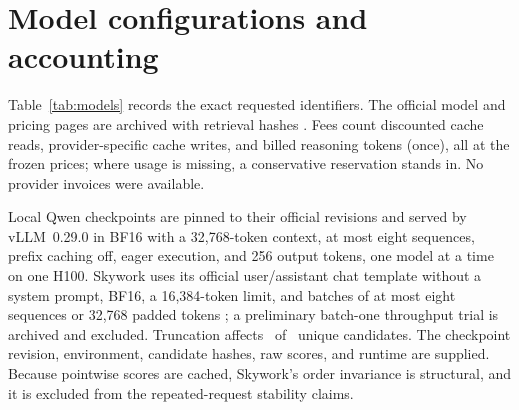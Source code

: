 \documentclass[11pt]{article}
\begin{document}
\section{Model configurations and accounting}
\label{app:models}
Table~\ref{tab:models} records the exact requested identifiers. The official model and pricing pages are archived with retrieval hashes \citep{jevmodels,gptminiapi,gptapi,gptreasonapi,gpt54api,gpt56api,gpt6api,groqoss,groqqwen36,groqqwen38,claudepricing,geminipricing}. Fees count discounted cache reads, provider-specific cache writes, and billed reasoning tokens (once), all at the frozen prices; where usage is missing, a conservative reservation stands in. No provider invoices were available.
\begin{apptable}
\centering\small\setlength{\tabcolsep}{3pt}
\caption{Exact requested identifiers/settings. Prices are USD per million input/output tokens before cache adjustments. JEV charges for input tokens and has zero output-token fees. Local models have no assigned API-equivalent dollar price.}
\label{tab:models}
\end{apptable}
Local Qwen checkpoints are pinned to their official revisions \citep{qwen3card,qwen35card} and served by vLLM~0.29.0 in BF16 with a 32,768-token context, at most eight sequences, prefix caching off, eager execution, and 256 output tokens, one model at a time on one H100. Skywork uses its official user/assistant chat template without a system prompt, BF16, a 16,384-token limit, and batches of at most eight sequences or 32,768 padded tokens \citep{skywork}; a preliminary batch-one throughput trial is archived and excluded. Truncation affects \revSkyTruncated\ of \revSkyCandidates\ unique candidates. The checkpoint revision, environment, candidate hashes, raw scores, and runtime are supplied. Because pointwise scores are cached, Skywork's order invariance is structural, and it is excluded from the repeated-request stability claims.
\FloatBarrier
\end{document}

